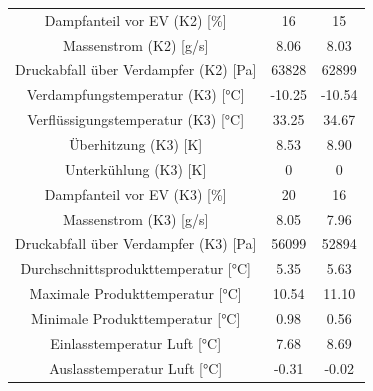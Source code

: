 \begin{table}[h!]
\begin{tabular}{|ccc|}
\multicolumn{1}{|c|}{Dampfanteil vor EV (K2) {[}\%{]}}          & \multicolumn{1}{c|}{16}     & 15          \\
\multicolumn{1}{|c|}{Massenstrom (K2) {[}g/s{]}}                & \multicolumn{1}{c|}{8.06}   & 8.03        \\
\multicolumn{1}{|c|}{Druckabfall über Verdampfer (K2) {[}Pa{]}} & \multicolumn{1}{c|}{63828}  & 62899       \\ \hline
\multicolumn{1}{|c|}{Verdampfungstemperatur (K3) {[}°C{]}}      & \multicolumn{1}{c|}{-10.25} & -10.54      \\
\multicolumn{1}{|c|}{Verflüssigungstemperatur (K3) {[}°C{]}}    & \multicolumn{1}{c|}{33.25}  & 34.67       \\
\multicolumn{1}{|c|}{Überhitzung (K3) {[}K{]}}                  & \multicolumn{1}{c|}{8.53}   & 8.90        \\
\multicolumn{1}{|c|}{Unterkühlung (K3) {[}K{]}}                 & \multicolumn{1}{c|}{0}      & 0           \\
\multicolumn{1}{|c|}{Dampfanteil vor EV (K3) {[}\%{]}}          & \multicolumn{1}{c|}{20}     & 16          \\
\multicolumn{1}{|c|}{Massenstrom (K3) {[}g/s{]}}                & \multicolumn{1}{c|}{8.05}   & 7.96        \\
\multicolumn{1}{|c|}{Druckabfall über Verdampfer (K3) {[}Pa{]}} & \multicolumn{1}{c|}{56099}  & 52894       \\ \hline
\multicolumn{1}{|c|}{Durchschnittsprodukttemperatur {[}°C{]}}   & \multicolumn{1}{c|}{5.35}   & 5.63        \\
\multicolumn{1}{|c|}{Maximale Produkttemperatur {[}°C{]}}       & \multicolumn{1}{c|}{10.54}  & 11.10       \\
\multicolumn{1}{|c|}{Minimale Produkttemperatur {[}°C{]}}       & \multicolumn{1}{c|}{0.98}   & 0.56        \\
\multicolumn{1}{|c|}{Einlasstemperatur Luft {[}°C{]}}           & \multicolumn{1}{c|}{7.68}   & 8.69        \\
\multicolumn{1}{|c|}{Auslasstemperatur Luft {[}°C{]}}           & \multicolumn{1}{c|}{-0.31}  & -0.02       \\ \hline
\end{tabular}
\end{table}





\clearpage











